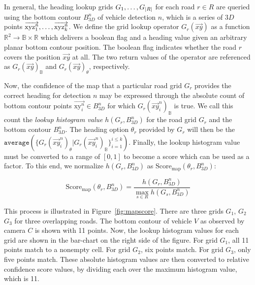 In general, the heading lookup grids $G_1,\mathellipsis,G_{|R|}$ for each road $r \in R$ are queried using the bottom contour $B^n_{3D}$ of vehicle detection $n$, which is a series of $3D$ points $\overrightarrow{\text{xyz}^n_1},\mathellipsis,\overrightarrow{\text{xyz}^n_k}$.
We define the grid lookup operator $G_r(\overrightarrow{xy})$ as a function $\mathbb{R}^2 \rightarrow \mathbb{B} \times \mathbb{R}$ which delivers a boolean flag and a heading value given an arbitrary planar bottom contour position.
The boolean flag indicates whether the road $r$ covers the position $\overrightarrow{xy}$ at all.
The two return values of the operator are referenced as $G_r(\overrightarrow{xy})_\mathbb{B}$ and $G_r(\overrightarrow{xy})_\theta$, respectively.

Now, the confidence of the map that a particular road grid $G_r$ provides the correct heading for detection $n$ may be expressed through the absolute count of bottom contour points $\overrightarrow{\text{xy}^n_i} \in B^n_{3D}$ for which $G_r(\overrightarrow{xy}^n_i)_\mathbb{B}$ is true.
We call this count the \textit{lookup histogram value} $h(G_r,B^n_{3D})$ for the road grid $G_r$ and the bottom contour $B^n_{3D}$.
The heading option $\theta_r$ provided by $G_r$ will then be the $\mathtt{average}(\{G_r(\overrightarrow{xy}^n_i)_\theta|G_r(\overrightarrow{xy}^n_i)_\mathbb{B}\}_{i=1}^{i \leq k})$.
Finally, the lookup histogram value must be converted to a range of $[0,1]$ to become a score which can be used as a factor.
To this end, we normalize $h(G_r,B^n_{3D})$ as $\text{Score}_\text{map}(\theta_r, B^n_{3D})$:

\[
    \text{Score}_\text{map}(\theta_r, B^n_{3D})=\frac{h(G_r,B^n_{3D})}{\max_{s \in R} h(G_s,B^n_{3D})}
\]

This process is illustrated in Figure~\ref{fig:mapscore}.
There are three grids $G_1$, $G_2$ $G_3$ for three overlapping roads.
The bottom contour of vehicle $V$ as observed by camera $C$ is shown with 11 points.
Now, the lookup histogram values for each grid are shown in the bar-chart on the right side of the figure.
For grid $G_1$, all 11 points match to a nonempty cell.
For grid $G_2$, six points match.
For grid $G_3$, only five points match.
These absolute histogram values are then converted to relative confidence score values, by dividing each over the maximum histogram value, which is 11.

